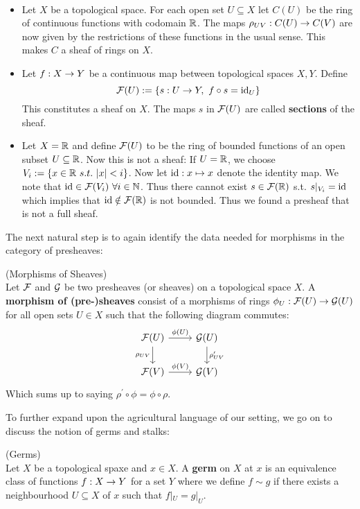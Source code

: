 \begin{example}~
\begin{itemize}
  \item Let $X$ be a topological space. For each open set $U\subseteq X$ let $C(U)$ be the ring of continuous functions with codomain $\mathbb{R}$. The maps $\rho_{UV}:C(U)\rightarrow C(V)$ are now given by the restrictions of these functions in the usual sense. This makes $C$ a sheaf of rings on $X$.
  \item Let $f:X\rightarrow Y$ be a continuous map between topological spaces $X,Y$. Define
  $$ {\mathcal{F}}(U):=\{ s:U\rightarrow Y, \ f\circ s = \operatorname{id}_U \} $$
  This constitutes a sheaf on $X$. The maps $s$ in ${\mathcal{F}}(U)$ are called \textbf{sections} of the sheaf.
  \item Let $X= \mathbb{R}$ and define ${\mathcal{F}}(U)$ to be the ring of bounded functions of an open subset $U\subseteq \mathbb{R}$. Now this is not a sheaf: If $U = \mathbb{R}$, we choose $V_i := \{x \in \mathbb{R} \ s.t. \ |x| <i \}$. Now let $\operatorname{id} :x \mapsto x$ denote the identity map. We note that $\operatorname{id} \in {\mathcal{F}}(V_i) \ \forall i \in \mathbb{N}$. Thus there cannot exist $s \in {\mathcal{F}}(\mathbb{R})$ s.t. $s|_{V_i} = \operatorname{id}$ which implies that $\operatorname{id} \notin {\mathcal{F}}(\mathbb{R})$ is not bounded. Thus we found a presheaf that is not a full sheaf.
\end{itemize}
\end{example}

The next natural step is to again identify the data needed for morphisms in the category of presheaves:

\begin{definition} (Morphisms of Sheaves)\\
  Let ${\mathcal{F}}$ and ${\mathcal{G}}$ be two presheaves (or sheaves) on a topological space $X$. A \textbf{morphism of (pre-)sheaves} consist of a morphisms of rings $\phi_U: \FF(U) \ra \GG(U)$ for all open sets $U \in X$ such that the following diagram commutes:
  \[
  \begin{tikzcd}
    \FF(U) \arrow{r}{\phi(U)} \arrow[swap]{d}{\rho_{UV}} & \GG(U) \arrow{d}{\rho^\prime_{UV}} \\
    \FF(V) \arrow{r}{\phi(V)} & \GG(V)
  \end{tikzcd}
  \]
  Which sums up to saying $\rho^\prime \circ \phi = \phi \circ \rho$.
\end{definition}

To further expand upon the agricultural language of our setting, we go on to discuss the notion of germs and stalks:

\begin{definition} (Germs)\\
  Let $X$ be a topological spaxe and $x \in X$. A \textbf{germ} on $X$ at $x$ is an equivalence class of functions $f:X \rightarrow Y$ for a set $Y$ where we define $f\sim g$ if there exists a neighbourhood $U\subseteq X$ of $x$ such that $f|_U = g|_U$.
\end{definition}

